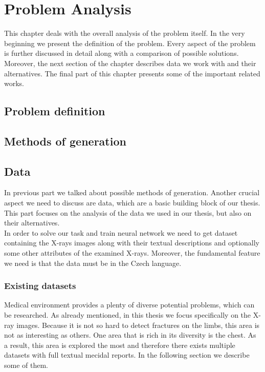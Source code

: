 \chapter{Problem Analysis}
This chapter deals with the overall analysis of the problem itself. In the very beginning we present the definition of the problem. Every aspect of the problem is further discussed in detail along with a comparison of possible solutions. Moreover, the next section of the chapter describes data we work with and their alternatives. The final part of this chapter presents some of the important related works.

\section{Problem definition}

\section{Methods of generation}

\section{Data}
In previous part we talked about possible methods of generation. Another crucial aspect we need to discuss are data, which are a basic building block of our thesis. This part focuses on the analysis of the data we used in our thesis, but also on their alternatives. \\

In order to solve our task and train neural network we need to get dataset containing the X-rays images along with their textual descriptions and optionally some other attributes of the examined X-rays. Moreover, the fundamental feature we need is that the data must be in the Czech language.

\subsection{Existing datasets}
Medical environment provides a plenty of diverse potential problems, which can be researched. As already mentioned, in this thesis we focus specifically on the X-ray images. Because it is not so hard to detect fractures on the limbs, this area is not as interesting as others. One area that is rich in its diversity is the chest. As a result, this area is explored the most and therefore there exists multiple datasets with full textual mecidal reports. In the following section we describe some of them.

